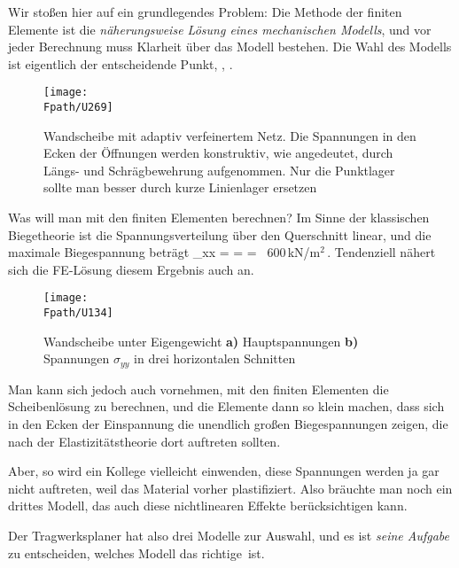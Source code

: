 {Wir sto{\ss}en hier auf ein grundlegendes Problem: Die Methode der finiten Elemente ist die {\em n\"{a}herungsweise L\"{o}sung eines mechanischen Modells\/}, und vor jeder Berechnung muss Klarheit \"{u}ber das Modell bestehen. Die Wahl des Modells ist eigentlich der entscheidende Punkt, \cite{Duddeck}, \cite{Duddeck2}.
\begin{figure}
\centering
\texttt{[image: \\Fpath/U269]}
\caption{Wandscheibe mit adaptiv verfeinertem Netz. Die Spannungen in den Ecken der \"{O}ffnungen werden konstruktiv, wie angedeutet, durch L\"{a}ngs- und Schr\"{a}gbewehrung aufgenommen. Nur die Punktlager sollte man besser durch kurze Linienlager ersetzen}
\label{U269}%
\end{figure}%

Was will man mit den finiten Elementen berechnen? Im Sinne der klassischen Biegetheorie ist die Spannungsverteilung \"{u}ber den Querschnitt linear, und die maximale Biegespannung betr\"{a}gt
\bfo
\sigma_{xx} =  =  = \pm\, 600\,\mbox{kN/m$^2$}\,.
\efo
Tendenziell n\"{a}hert sich die FE-L\"{o}sung diesem Ergebnis auch an.
\begin{figure}
\centering
\texttt{[image: \\Fpath/U134]}
\caption{Wandscheibe unter Eigengewicht \textbf{ a)} Hauptspannungen \textbf{ b)} Spannungen $\sigma_{yy} $ in drei horizontalen Schnitten}
\label{U134}%
\end{figure}%

Man kann sich jedoch auch vornehmen, mit den finiten Elementen die Scheibenl\"{o}sung zu berechnen, und die Elemente dann so klein machen, dass sich in den Ecken der Einspannung die unendlich gro{\ss}en Biegespannungen zeigen, die nach der Elastizit\"{a}tstheorie dort auftreten sollten.

Aber, so wird ein Kollege vielleicht einwenden, diese Spannungen werden ja gar nicht auftreten, weil das Material vorher plastifiziert. Also br\"{a}uchte man noch ein drittes Modell, das auch diese nichtlinearen Effekte ber\"{u}cksichtigen kann.

Der Tragwerksplaner hat also drei Modelle zur Auswahl, und es ist {\em seine Aufgabe\/} zu entscheiden, welches Modell das \glq richtige\grq\ ist.

}
